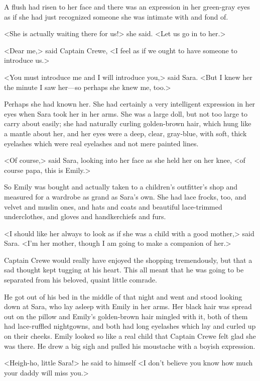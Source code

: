 A flush had risen to her face and there was an expression in her green-gray eyes as if she had just recognized someone she was intimate with and fond of.

<She is actually waiting there for us!> she said. <Let us go in to her.>

<Dear me,> said Captain Crewe, <I feel as if we ought to have someone to introduce us.>

<You must introduce me and I will introduce you,> said Sara. <But I knew her the minute I saw her—so perhaps she knew me, too.>

Perhaps she had known her. She had certainly a very intelligent expression in her eyes when Sara took her in her arms. She was a large doll, but not too large to carry about easily; she had naturally curling golden-brown hair, which hung like a mantle about her, and her eyes were a deep, clear, gray-blue, with soft, thick eyelashes which were real eyelashes and not mere painted lines.

<Of course,> said Sara, looking into her face as she held her on her knee, <of course papa, this is Emily.>

So Emily was bought and actually taken to a children's outfitter's shop and measured for a wardrobe as grand as Sara's own. She had lace frocks, too, and velvet and muslin ones, and hats and coats and beautiful lace-trimmed underclothes, and gloves and handkerchiefs and furs.

<I should like her always to look as if she was a child with a good mother,> said Sara. <I'm her mother, though I am going to make a companion of her.>

Captain Crewe would really have enjoyed the shopping tremendously, but that a sad thought kept tugging at his heart. This all meant that he was going to be separated from his beloved, quaint little comrade.

He got out of his bed in the middle of that night and went and stood looking down at Sara, who lay asleep with Emily in her arms. Her black hair was spread out on the pillow and Emily's golden-brown hair mingled with it, both of them had lace-ruffled nightgowns, and both had long eyelashes which lay and curled up on their cheeks. Emily looked so like a real child that Captain Crewe felt glad she was there. He drew a big sigh and pulled his moustache with a boyish expression.

<Heigh-ho, little Sara!> he said to himself <I don't believe you know how much your daddy will miss you.>

